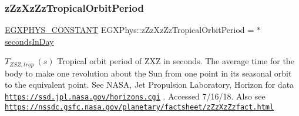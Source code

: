 \subsubsection{\texorpdfstring{z\+Zz\+Xz\+Zz\+Tropical\+Orbit\+Period}{zZzXzZzTropicalOrbitPeriod}}
{\footnotesize\ttfamily \mbox{\hyperlink{group___e_g_x_phys-_constants-_macros_ga76980d288494ce1714c9ac68a95ba702}{E\+G\+X\+P\+H\+Y\+S\+\_\+\+C\+O\+N\+S\+T\+A\+NT}} E\+G\+X\+Phys\+::z\+Zz\+Xz\+Zz\+Tropical\+Orbit\+Period = $\ast$\mbox{\hyperlink{namespace_e_g_x_phys_a93d2a00d75411b58cbf63ab3fd1f8bc2}{seconds\+In\+Day}}}

$ T_{ZSZ,trop} \ (s)$ Tropical orbit period of Z\+XZ in seconds. The average time for the body to make one revolution about the Sun from one point in its seasonal orbit to the equivalent point. See N\+A\+SA, Jet Propulsion Laboratory, Horizon for data \href{https://ssd.jpl.nasa.gov/horizons.cgi}{\tt https\+://ssd.\+jpl.\+nasa.\+gov/horizons.\+cgi} . Accessed 7/16/18. Also see \href{https://nssdc.gsfc.nasa.gov/planetary/factsheet/zZzXzZzfact.html}{\tt https\+://nssdc.\+gsfc.\+nasa.\+gov/planetary/factsheet/z\+Zz\+Xz\+Zzfact.\+html} 